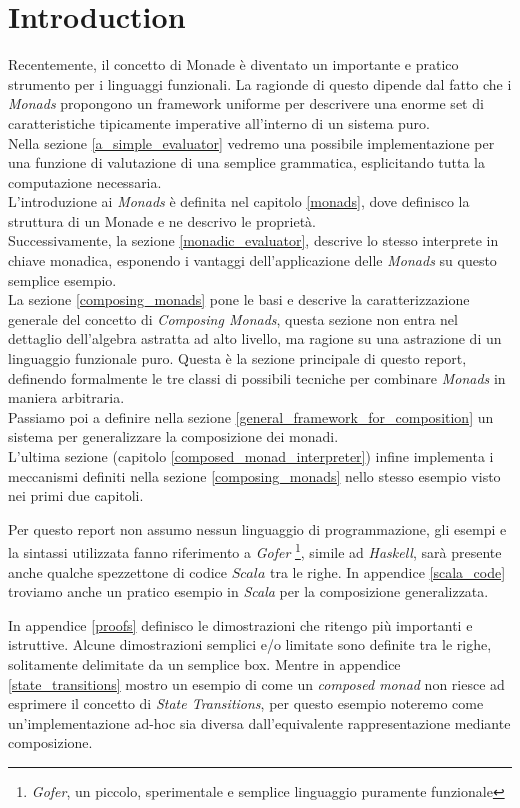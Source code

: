 \section{Introduction}

Recentemente, il concetto di Monade è diventato un importante e pratico
strumento per i linguaggi funzionali.
La ragionde di questo dipende dal fatto che i \textit{Monads} propongono un
framework uniforme per descrivere una enorme set di caratteristiche tipicamente
imperative all'interno di un sistema puro.\\
Nella sezione \ref{a_simple_evaluator} vedremo una possibile implementazione per
una funzione di valutazione di una semplice grammatica, esplicitando tutta la
computazione necessaria.\\
L'introduzione ai \textit{Monads} è definita nel capitolo \ref{monads}, dove
definisco la struttura di un Monade e ne descrivo le proprietà.\\
Successivamente, la sezione \ref{monadic_evaluator}, descrive lo stesso
interprete in chiave monadica, esponendo i vantaggi dell'applicazione delle
\textit{Monads} su questo semplice esempio.\\
La sezione \ref{composing_monads} pone le basi e descrive la caratterizzazione
generale del concetto di \textit{Composing Monads}, questa sezione non entra nel
dettaglio dell'algebra astratta ad alto livello, ma ragione su una astrazione
di un linguaggio funzionale puro. Questa è la sezione principale di questo
report, definendo formalmente le tre classi di possibili tecniche per combinare
\textit{Monads} in maniera arbitraria.\\
Passiamo poi a definire nella sezione \ref{general_framework_for_composition}
un sistema per generalizzare la composizione dei monadi.\\
L'ultima sezione (capitolo \ref{composed_monad_interpreter}) infine implementa
i meccanismi definiti nella sezione \ref{composing_monads} nello stesso esempio
visto nei primi due capitoli.\newline

Per questo report non assumo nessun linguaggio di programmazione, gli esempi e
la sintassi utilizzata fanno riferimento a \textit{Gofer}
\footnote{\textit{Gofer}, un piccolo, sperimentale e semplice linguaggio
puramente funzionale}, simile ad \textit{Haskell}, sarà presente anche qualche
spezzettone di codice $Scala$ tra le righe.
In appendice \ref{scala_code} troviamo anche un pratico esempio in \textit{Scala} per la composizione
generalizzata.\newline

In appendice \ref{proofs} definisco le dimostrazioni che ritengo più importanti
e istruttive. Alcune dimostrazioni semplici e/o limitate sono definite tra le
righe, solitamente delimitate da un semplice box.
Mentre in appendice \ref{state_transitions} mostro un esempio di come un
\textit{composed monad} non riesce ad esprimere il concetto di
\textit{State Transitions}, per questo esempio noteremo come un'implementazione
ad-hoc sia diversa dall'equivalente rappresentazione mediante composizione.


\newpage